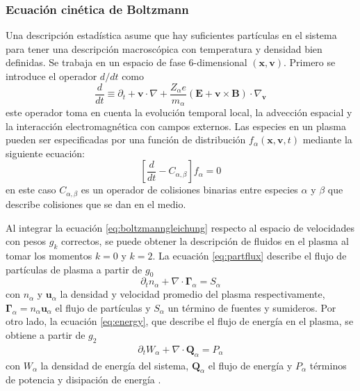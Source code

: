 \subsubsection{Ecuación cinética de Boltzmann}

Una descripción estadística asume que hay suficientes partículas en el sistema para tener una descripción macroscópica con temperatura y densidad bien definidas. Se trabaja en un espacio de fase 6-dimensional $(\bm{x}, \bm{v})$. Primero se introduce el operador $d/dt $ como
\begin{equation}
	\frac{d}{dt} \equiv \partial_t + \textbf{v}\cdot\nabla + \frac{Z_\alpha e}{m_\alpha}(\textbf{E} + \textbf{v}\times\textbf{B})\cdot \nabla_\textbf{v}
\end{equation}
este operador toma en cuenta la evolución temporal local, la advección espacial y la interacción electromagnética con campos externos. Las especies en un plasma pueden ser especificadas por una función de distribución $f_\alpha(\bm{x}, \bm{v}, t)$ mediante la siguiente ecuación:
 \begin{equation}\label{eq:boltzmanngleichung}                                                                                          
    \left[\frac{d}{dt} - C_{\alpha,\beta}\right]f_\alpha = 0
  \end{equation}
en este caso $C_{\alpha, \beta}$ es un operador de colisiones binarias entre especies $\alpha$ y $\beta$ que describe colisiones que se dan en el medio.

Al integrar la ecuación \eqref{eq:boltzmanngleichung} respecto al espacio de velocidades con pesos $g_k$ correctos, se puede obtener la descripción de fluidos en el plasma al tomar los momentos $k=0$ y $k=2$. La ecuación \eqref{eq:partflux} describe el flujo de partículas de plasma a partir de $g_0$
\begin{equation}\label{eq:partflux}
	\partial_t n_\alpha + \nabla\cdot\bm{\Gamma}_\alpha = S_\alpha
\end{equation}
con $n_\alpha$ y $\bm{u}_\alpha$ la densidad y velocidad promedio del plasma respectivamente, $\bm{\Gamma}_\alpha = n_\alpha\bm{u}_\alpha$ el flujo de partículas y $S_\alpha$ un término de fuentes y sumideros. Por otro lado, la ecuación \eqref{eq:energy}, que describe el flujo de energía en el plasma, se obtiene a partir de $g_2$ 
\begin{eqnarray}\label{eq:energy}
	\partial_t W_\alpha + \nabla\cdot\bm{Q}_\alpha =  P_\alpha
\end{eqnarray}
con $W_\alpha$ la densidad de energía del sistema, $\bm{Q}_\alpha$ el flujo de energía y $P_\alpha$ términos de potencia y disipación de energía \cite{helander2005, freidberg2014}. 

